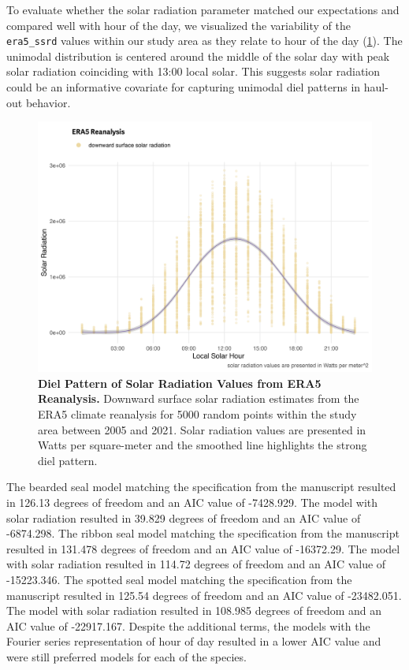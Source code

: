 \documentclass[fleqn,10pt,lineno]{wlpeerj} %
\begin{document}
To evaluate whether the solar radiation parameter matched our expectations and
compared well with hour of the day, we visualized the variability of the
\texttt{era5\_ssrd} values within
our study area as they relate to hour of the day (\ref{fig:era5-ssrd-plot}).
The unimodal distribution
is centered around the middle of the solar day with peak solar radiation
coinciding with 13:00 local solar. This suggests solar radiation could be an
informative covariate for capturing unimodal diel patterns in haul-out
behavior.



\begin{figure}
\includegraphics[width=1\linewidth]{../figures/era5-ssrd-plot-1} \caption{\textbf{Diel Pattern of Solar Radiation Values from ERA5 Reanalysis.} \linebreak Downward surface solar radiation estimates from the ERA5 climate reanalysis for 5000 random points within the study area between 2005 and 2021. Solar radiation values are presented in Watts per square-meter and the smoothed line highlights the strong diel pattern.}\label{fig:era5-ssrd-plot}
\end{figure}

The bearded seal model matching the specification from the manuscript resulted in
126.13 degrees of freedom and an AIC value of
-7428.929. The model with solar radiation resulted in
39.829 degrees of freedom and an AIC value of
-6874.298. The ribbon seal model matching the specification from the manuscript resulted in
131.478 degrees of freedom and an AIC value of
-16372.29. The model with solar radiation resulted in
114.72 degrees of freedom and an AIC value of
-15223.346. The spotted seal model matching the specification from the manuscript resulted in
125.54 degrees of freedom and an AIC value of
-23482.051. The model with solar radiation resulted in
108.985 degrees of freedom and an AIC value of
-22917.167. Despite the additional terms, the
models with the Fourier series representation of hour of day resulted in a
lower AIC value and were still preferred models for each of the species.
\end{document}
